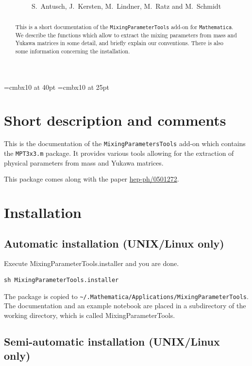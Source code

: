 \documentclass[12pt,a4paper,twoside]{scrartcl}
\newcommand{\package}[1]{{\tt #1}}
\numberwithin{equation}{section}
\numberwithin{table}{section}
\def\Mathematica{\texttt{Mathematica}}
\begin{document}
\font\TitleFont=cmbx10 at 40pt
\font\SubTitleFont=cmbx10 at 25pt
\title{\\[1cm]
        }
\author{S.~Antusch, J.~Kersten, M.~Lindner, M.~Ratz and M.~Schmidt}
\maketitle
\begin{abstract}
 This is a short documentation of the \package{MixingParameterTools} add-on for
 \Mathematica. We describe the functions which allow to extract the mixing
 parameters from mass and Yukawa matrices in some detail, and briefly explain
 our conventions. There is also some information concerning the installation.
\end{abstract}
\thispagestyle{empty}
\tableofcontents
\clearpage


\section{Short description and comments}

This is the documentation of the \package{MixingParametersTools} add-on which
contains the \package{MPT3x3.m} package. It provides various tools allowing
for the extraction of physical parameters from mass and Yukawa matrices.

This package comes along with the paper
\href{http://arxiv.org/abs/hep-ph/0501272}{hep-ph/0501272}.


\section{Installation}

\subsection{Automatic installation (UNIX/Linux only)}

Execute MixingParameterTools.installer and you are done.
\begin{verbatim}
sh MixingParameterTools.installer
\end{verbatim}
The package is copied to
\verb+~/.Mathematica/Applications/MixingParameterTools+.  
The documentation and an example notebook are placed in a subdirectory
of the working directory, which is called MixingParameterTools.


\subsection{Semi-automatic installation (UNIX/Linux only)}
\end{document}
